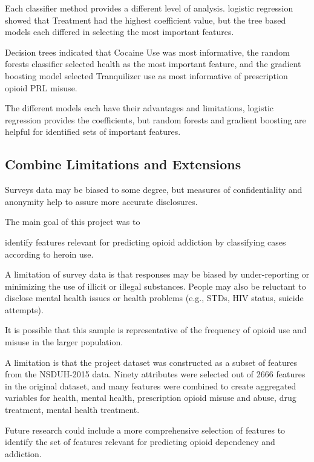 \documentclass[sigconf]{acmart}
\begin{document}
Each classifier method provides a different level of
analysis. 
logistic regression showed that Treatment had the highest coefficient value, but 
the tree based models each differed in selecting the most important features. 

Decision trees indicated that Cocaine Use was most informative, the random 
forests classifier selected health as the most important feature, and the 
gradient boosting model selected 
Tranquilizer use as most informative of prescription opioid PRL misuse. 

The different models each have their advantages and limitations, logistic regression provides the coefficients, but random forests and gradient boosting are helpful for 
identified sets of important features.

\subsection{Combine Limitations and Extensions}

Surveys data may be biased to some degree, but measures of confidentiality and 
anonymity help to assure more accurate disclosures. 

The main goal of this project was to 


identify features relevant for predicting 
opioid addiction by classifying cases according to heroin use. 

A limitation of survey data is that responses may be biased by under-reporting or minimizing the use of illicit or illegal substances. People may also be reluctant to disclose mental health issues or health problems (e.g., STDs, HIV status, suicide attempts). 

It is possible that this sample is representative of the frequency of opioid use 
and misuse in the larger population.


A limitation is that the project dataset was constructed as a subset of 
features from the NSDUH-2015 data. 
Ninety attributes were selected out of 2666 features in the original dataset, 
and many features were combined to create aggregated variables for health, 
mental health, prescription opioid misuse and abuse, drug treatment, mental health
treatment. 

Future research could include a more comprehensive selection of
features to identify the set of features relevant for predicting opioid
dependency and addiction. 
\end{document}
